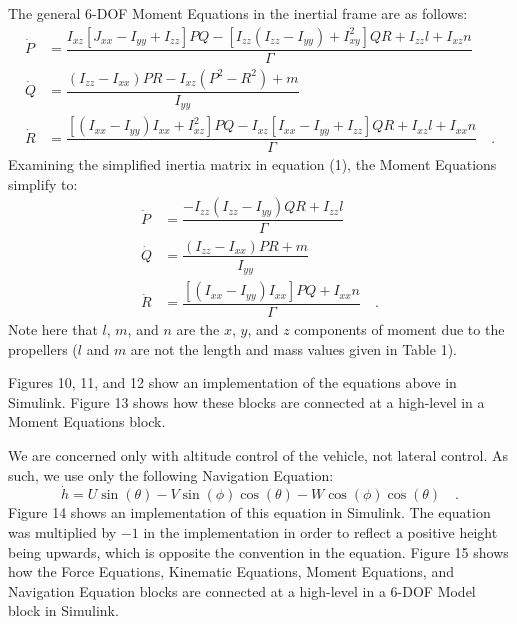 The general 6-DOF Moment Equations in the inertial frame are as follows:
\begin{align*}
    \dot{P} &= \dfrac{I_{xz}[ J_{xx} - I_{yy} + I_{zz} ]PQ - [ I_{zz}(I_{zz} - I_{yy}) + I_{xy}^2 ]QR + I_{zz} l + I_{xz} n}{\Gamma} \\
    \dot{Q} &= \dfrac{(I_{zz} - I_{xx})PR - I_{xz}(P^2 - R^2) + m}{I_{yy}} \\
    \dot{R} &= \dfrac{[(I_{xx} - I_{yy})I_{xx} + I_{xz}^2]PQ - I_{xz}[I_{xx} - I_{yy} + I_{zz}]QR + I_{xz} l + I_{xx} n}{\Gamma} \quad .
\end{align*}
Examining the simplified inertia matrix in equation (1), the Moment Equations simplify to:
\begin{align}
    \dot{P} &= \dfrac{-I_{zz}(I_{zz} - I_{yy})QR + I_{zz} l}{\Gamma} \\
    \dot{Q} &= \dfrac{(I_{zz} - I_{xx})PR + m}{I_{yy}} \\
    \dot{R} &= \dfrac{[(I_{xx} - I_{yy})I_{xx}]PQ + I_{xx} n}{\Gamma} \quad .
\end{align}
\noindent Note here that $l$, $m$, and $n$ are the $x$, $y$, and $z$ components of moment due to the propellers ($l$ and $m$ are not the length and mass values given in Table 1).

Figures 10, 11, and 12 show an implementation of the equations above in Simulink. Figure 13 shows how these blocks are connected at a high-level in a Moment Equations block.

We are concerned only with altitude control of the vehicle, not lateral control. As such, we use only the following Navigation Equation:
\begin{equation}
    \dot{h} = U\sin(\theta) - V\sin(\phi)\cos(\theta) - W\cos(\phi)\cos(\theta) \quad .
\end{equation}
Figure 14 shows an implementation of this equation in Simulink. The equation was multiplied by $-1$ in the implementation in order to reflect a positive height being upwards, which is opposite the convention in the equation. Figure 15 shows how the Force Equations, Kinematic Equations, Moment Equations, and Navigation Equation blocks are connected at a high-level in a 6-DOF Model block in Simulink.
